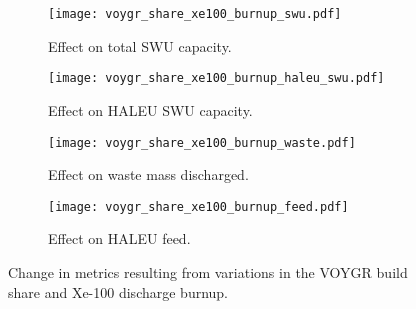 \begin{figure}
    \ContinuedFloat    
    \begin{subfigure}[b]{0.48\textwidth}
        \centering
        \texttt{[image: voygr\_share\_xe100\_burnup\_swu.pdf]}
        \caption{Effect on total SWU capacity.}
        \label{fig:voygr_share_xe100_burnup_swu}
    \end{subfigure}
    \hfill
    \begin{subfigure}[b]{0.48\textwidth}
        \centering
        \texttt{[image: voygr\_share\_xe100\_burnup\_haleu\_swu.pdf]}
        \caption{Effect on HALEU SWU capacity.}
        \label{fig:voygr_share_xe100_burnup_haleu_swu}
    \end{subfigure}
    
    \begin{subfigure}[b]{0.48\textwidth}
        \centering
        \texttt{[image: voygr\_share\_xe100\_burnup\_waste.pdf]}
        \caption{Effect on waste mass discharged.}
        \label{fig:voygr_share_xe100_burnup_waste}
    \end{subfigure}
    \hfill
    \begin{subfigure}[b]{0.48\textwidth}
        \centering
        \texttt{[image: voygr\_share\_xe100\_burnup\_feed.pdf]}
        \caption{Effect on HALEU feed.}
        \label{fig:voygr_share_xe100_burnup_feed}
    \end{subfigure}
    \caption{Change in metrics resulting from variations in the 
    VOYGR build share and Xe-100 discharge burnup.}
    \label{fig:voygr_share_xe100_burnup}
\end{figure}
